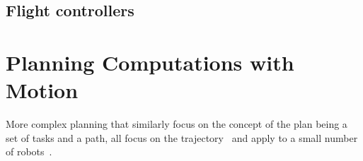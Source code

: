 



















\subsection{\color{orange}Flight controllers}




\section{\color{cyan}Planning Computations with Motion}
\label{sec:soa-comp-motion-pl}


More complex planning that similarly focus on the concept of the plan being a set of tasks and a path, all focus on the trajectory~\cite{mei2005case,mei2006deployment} and apply to a small number of robots~\cite{sadrpour2013mission,sadrpour2013experimental}.

